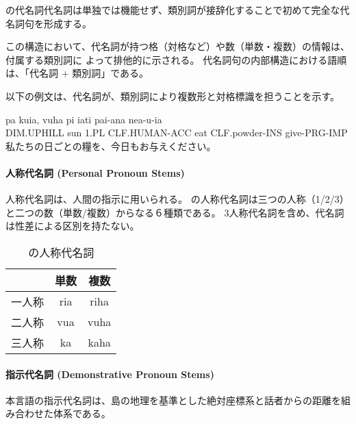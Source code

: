 \langname の代名詞代名詞は単独では機能せず、類別詞が接辞化することで初めて完全な代名詞句を形成する。

この構造において、代名詞が持つ格（対格など）や数（単数・複数）の情報は、付属する類別詞に
よって排他的に示される。
代名詞句の内部構造における語順は、「代名詞 + 類別詞」である。

以下の例文は、代名詞が、類別詞により複数形と対格標識を担うことを示す。

\begin{exe}
    \ex \gll pa kuia, vuha pi iati pai-ana nea-u-ia \\
        DIM.UPHILL sun 1.PL CLF.HUMAN-ACC eat CLF.powder-INS give-PRG-IMP \\
        \glt 私たちの日ごとの糧を、今日もお与えください。
\end{exe}

\paragraph{人称代名詞 (Personal Pronoun Stems)}
人称代名詞は、人間の指示に用いられる。
\langname の人称代名詞は三つの人称（1/2/3）と二つの数（単数/複数）からなる６種類である。
3人称代名詞を含め、代名詞は性差による区別を持たない。

\begin{table}[H]
    \centering
    \begin{tabular}{lcc}
        \toprule
        & 単数 & 複数  \\
        \midrule
        一人称 & ria & riha \\
        二人称 & vua & vuha \\
        三人称 & ka & kaha \\
        \bottomrule
    \end{tabular}
    \caption{\centering \langname の人称代名詞}
    \label{tab:pronouns}
\end{table}

\paragraph{指示代名詞 (Demonstrative Pronoun Stems)}
本言語の指示代名詞は、島の地理を基準とした絶対座標系と話者からの距離を組み合わせた体系である。

